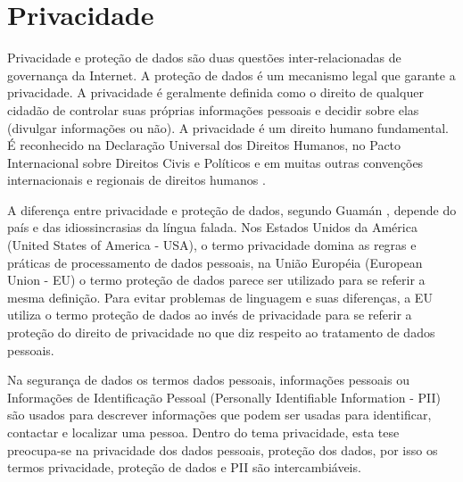 \chapter{Privacidade}
\label{cap:privacidade}




Privacidade e proteção de dados são duas questões inter-relacionadas de governança da Internet. A proteção de dados é um mecanismo legal que garante a privacidade. A privacidade é geralmente definida como o direito de qualquer cidadão de controlar suas próprias informações pessoais e decidir sobre elas (divulgar informações ou não). A privacidade é um direito humano fundamental. É reconhecido na Declaração Universal dos Direitos Humanos, no Pacto Internacional sobre Direitos Civis e Políticos e em muitas outras convenções internacionais e regionais de direitos humanos \cite{DWObservatory2022:online}.

A diferença entre privacidade e proteção de dados, segundo Guamán \cite{dsguaman2016:online}, depende do país e das idiossincrasias da língua falada. Nos Estados Unidos da América (United States of America - USA), o termo privacidade domina as regras e práticas de processamento de dados pessoais, na União Européia (European Union - EU) o termo proteção de dados parece ser utilizado para se referir a mesma definição. Para evitar problemas de linguagem e suas diferenças, a EU utiliza o termo proteção de dados ao invés de privacidade para se referir a proteção do direito de privacidade no que diz respeito ao tratamento de dados pessoais.

Na segurança de dados os termos dados pessoais, informações pessoais ou Informações de Identificação Pessoal (Personally Identifiable Information - PII) são usados para descrever informações que podem ser usadas para identificar, contactar e localizar uma pessoa. %
Dentro do tema privacidade, esta tese preocupa-se na privacidade dos dados pessoais, proteção dos dados, por isso os termos privacidade, proteção de dados e PII são intercambiáveis.

